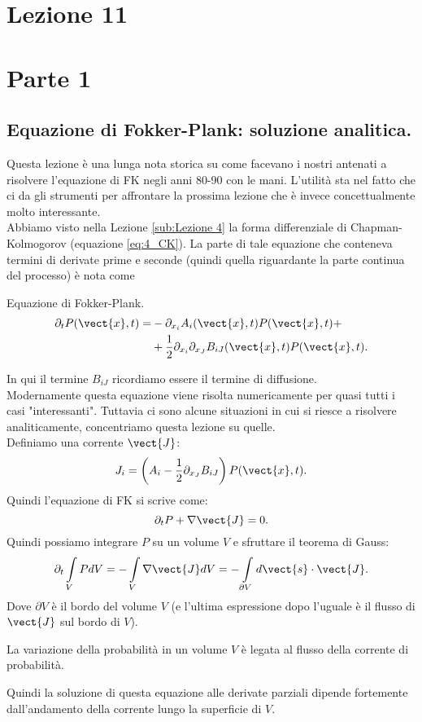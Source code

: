 \section{Lezione 11}%
\label{sub:Lezione 11-1}
\section*{Parte 1}%
\label{sub:Parte 1}

\subsection{Equazione di Fokker-Plank: soluzione analitica.}%
\label{sub:Equazione di Fokker-Plank: soluzione analitica.}
Questa lezione è una lunga nota storica su come facevano i nostri antenati a risolvere l'equazione di FK negli anni 80-90 con le mani. L'utilità sta nel fatto che ci da gli strumenti per affrontare la prossima lezione che è invece concettualmente molto interessante.\\
Abbiamo visto nella Lezione \ref{sub:Lezione 4} la forma differenziale di Chapman-Kolmogorov (equazione \ref{eq:4_CK}). La parte di tale equazione che conteneva termini di derivate prime e seconde (quindi quella riguardante la parte continua del processo) è nota come 
\begin{redbox}{Equazione di Fokker-Plank.}
   \[\begin{aligned}
       \partial_{t}P(\vect{x}, t) = &
      				      -\partial_{x_i}A_i(\vect{x}, t) P(\vect{x}, t) + \\
				    & + \frac{1}{2}\partial_{x_i}\partial_{x_J}B_{iJ}(\vect{x},t) P(\vect{x},t) 
   .\end{aligned}\]	 
\end{redbox}
\noindent
In qui il termine $B_{iJ}$ ricordiamo essere il termine di diffusione.\\
Modernamente questa equazione viene risolta numericamente per quasi tutti i casi "interessanti". Tuttavia ci sono alcune situazioni in cui si riesce a risolvere analiticamente, concentriamo questa lezione su quelle.\\
Definiamo una corrente $\vect{J}$:
\[
    J_i = \left(A_i - \frac{1}{2}\partial_{x_J}B_{iJ}\right)P(\vect{x},t) 
.\] 
Quindi l'equazione di FK si scrive come:
\[
    \partial_{t}P + \nabla \vect{J} = 0
.\] 
Quindi possiamo integrare $P$ su un volume $V$ e sfruttare il teorema di Gauss:
\[\begin{aligned}
    \partial_{t}\int\limits_{V} PdV = - \int\limits_{V}  \nabla \vect{J} dV = - \int\limits_{\partial V} d\vect{s}\cdot \vect{J}
.\end{aligned}\]
Dove $\partial V$ è il bordo del volume $V$ (e l'ultima espressione dopo l'uguale è il flusso di $\vect{J}$ sul bordo di $V$). 
\begin{greenbox}{}
    La variazione della probabilità in un volume $V$ è legata al flusso della corrente di probabilità.
\end{greenbox}
\noindent
Quindi la soluzione di questa equazione alle derivate parziali dipende fortemente dall'andamento della corrente lungo la superficie di $V$.
